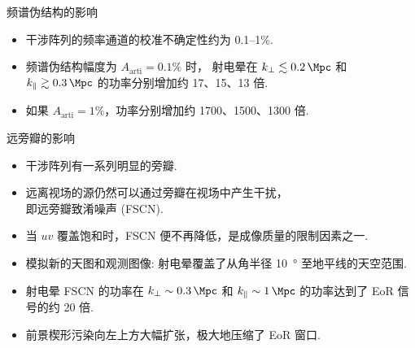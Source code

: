 \documentclass{beamer}
\newcommand{\R}[1]{\text{#1}}  %
\begin{document}
\begin{frame}{频谱伪结构的影响}
  \begin{itemize}
    \item 干涉阵列的频率通道的校准不确定性约为 0.1--1\%.
    \item 频谱伪结构幅度为 $A_{\R{arti}} = 0.1\%$ 时，
      射电晕在 $k_{\perp} \lesssim \SI{0.2}{\per\Mpc}$ 和
      $k_{\parallel} \gtrsim \SI{0.3}{\per\Mpc}$
      的功率分别增加约 17、15、13 倍.
    \item 如果 $A_{\R{arti}} = 1\%$，功率分别增加约 1700、1500、1300 倍.
  \end{itemize}

  \vspace{-1ex}
\end{frame}

\begin{frame}{远旁瓣的影响}
  \begin{itemize}
    \item 干涉阵列有一系列明显的旁瓣.
    \item 远离视场的源仍然可以通过旁瓣在视场中产生干扰，\\
      即\alert{远旁瓣致淆噪声 (FSCN)}.
    \item 当 $uv$ 覆盖饱和时，FSCN 便不再降低，是成像质量的限制因素之一.
  \end{itemize}

\end{frame}

\begin{frame}
  \begin{itemize}
    \item 模拟新的天图和观测图像:
      射电晕覆盖了从角半径 \SI{10}{\degree} 至地平线的天空范围.
    \item 射电晕 FSCN 的功率在 $k_{\perp} \sim \SI{0.3}{\per\Mpc}$ 和
      $k_{\parallel} \sim \SI{1}{\per\Mpc}$ 的功率达到了 EoR 信号的约 20 倍.
    \item 前景楔形污染向左上方大幅扩张，极大地压缩了 EoR 窗口.
  \end{itemize}

\end{frame}
\end{document}
